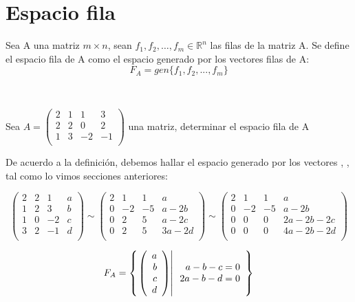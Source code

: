 \newpage
\section{Espacio fila}
\begin{dfn}
Sea A una matriz $m\times n$, sean $f_1,f_2,\ldots, f_m \in \mathbb{R}^n$ las filas de la matriz A. Se define el espacio fila de A como el espacio generado por los vectores filas de A:
~\\
\[F_A=gen\{f_1, f_2, ..., f_m\}\]
\end{dfn}
~\\

\begin{ejemplo}
Sea $A=
\left(
\begin{array}{rrrr}
2&1&1&3\\
2&2&0&2\\
1&3&-2&-1\\
\end{array}
\right)$ una matriz, determinar el espacio fila de A

 
De acuerdo a la definición, debemos hallar el espacio generado por los vectores , ,  tal como lo vimos secciones anteriores:

\[
\left(
\begin{array}{rrr|r}
2&2&1&a\\
1&2&3&b\\
1&0&-2&c\\
3&2&-1&d\\
\end{array}
\right)
\sim
\left(
\begin{array}{rrr|r}
2&1&1&a\\
0&-2&-5&a-2b\\
0&2&5&a-2c\\
0&2&5&3a-2d\\
\end{array}
\right)
\sim
\left(
\begin{array}{rrr|r}
2&1&1&a\\
0&-2&-5&a-2b\\
0&0&0&2a-2b-2c\\
0&0&0&4a-2b-2d\\
\end{array}
\right)
\]

\[F_A=\llaves{\vectr4{a}{b}{c}{d}}
{\begin{array}{r}
a-b-c=0\\
2a-b-d=0\\
\end{array}}
\]

\end{ejemplo}


